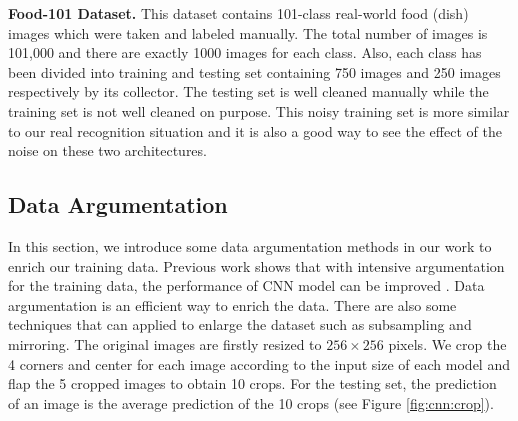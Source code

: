 \textbf{Food-101 Dataset.}
This dataset contains 101-class real-world food (dish) images which were taken and labeled manually. The total number of images is 101,000 and there are exactly 1000 images for each class. Also, each class has been divided into training and testing set containing 750 images and 250 images respectively by its collector. The testing set is well cleaned manually while the training set is not well cleaned on purpose. This noisy training set is more similar to our real recognition situation and it is also a good way to see the effect of the noise on these two architectures.

\subsection{Data Argumentation}
In this section, we introduce some data argumentation methods in our work to enrich our training data. Previous work shows that with intensive argumentation for the training data, the performance of CNN model can be improved \cite{wu2015deep}. 
Data argumentation is an efficient way to enrich the data. There are also some techniques that can applied to enlarge the dataset such as subsampling and mirroring. The original images are firstly resized to $256\times 256$ pixels. We crop the 4 corners and center for each image according to the input size of each model and flap the 5 cropped images to obtain 10 crops. For the testing set, the prediction of an image is the average prediction of the 10 crops (see Figure \ref{fig:cnn:crop}).

